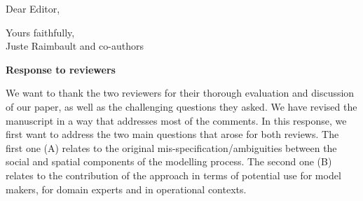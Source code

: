 \documentclass[11pt,a4paper,sans]{moderncv}        %
\begin{document}
\date{\today}
\opening{Dear Editor,}
\closing{Yours faithfully,\\
Juste Raimbault and co-authors%
}




\justify



\textbf{Response to reviewers}


\bigskip

We want to thank the two reviewers for their thorough evaluation and discussion of our paper, as well as the challenging questions they asked. We have revised the manuscript in a way that addresses most of the comments. In this response, we first want to address the two main questions that arose for both reviews. The first one (A) relates to the original mis-specification/ambiguities between the social and spatial components of the modelling process. The second one (B) relates to the contribution of the approach in terms of potential use for model makers, for domain experts and in operational contexts.
\end{document}
